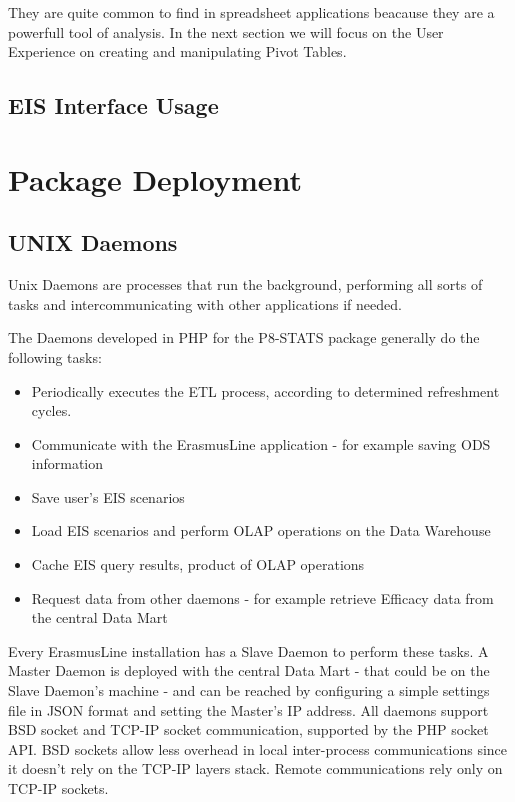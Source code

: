 They are quite common to find in spreadsheet applications beacause they are a
powerfull tool of analysis. In the next section we will focus on the User
Experience on creating and manipulating Pivot Tables.


\subsection{EIS Interface Usage}


\section{Package Deployment}\label{sec:deployment}


\subsection{UNIX Daemons}

Unix Daemons are processes that run the background, performing all sorts of
tasks and intercommunicating with other applications if needed.

The Daemons developed in PHP for the P8-STATS package generally do the following
tasks:

\begin{itemize}
  \item Periodically executes the ETL process, according to determined
  refreshment cycles.
  \item Communicate with the ErasmusLine application - for example saving ODS
  information
  \item Save user’s EIS scenarios
  \item Load EIS scenarios and perform OLAP operations on the Data Warehouse
  \item Cache EIS query results, product of OLAP operations
  \item Request data from other daemons - for example retrieve Efficacy data from
the central Data Mart
\end{itemize}

Every ErasmusLine installation has a Slave Daemon to perform these tasks. A
Master Daemon is deployed with the central Data Mart - that could be on the
Slave Daemon’s machine - and can be reached by configuring a simple settings
file in JSON format and setting the Master’s IP address. All daemons support
BSD socket and TCP-IP socket communication, supported by the PHP socket API.
BSD sockets allow less overhead in local inter-process communications
since it doesn't rely on the TCP-IP layers stack. Remote communications rely
only on TCP-IP sockets.

